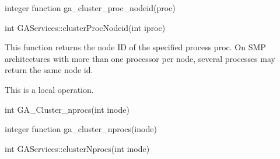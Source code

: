 \documentclass[12pt]{article}
\begin{document}
\begin{fapi}
\begin{fcode}
integer function ga_cluster_proc_nodeid(proc)
\end{fcode}
\begin{funcargs}
\end{funcargs}
\end{fapi}

\begin{cxxapi}
\begin{cxxcode}
int GAServices::clusterProcNodeid(int iproc)
\end{cxxcode}
\begin{funcargs}
\end{funcargs}
\end{cxxapi}

\begin{desc}

This function returns the node ID of the specified process proc. 
On SMP architectures with more than one processor per node, several 
processes may return the same node id.

This is a  local operation.
\end{desc}


\begin{capi}
\begin{ccode}
int GA_Cluster_nprocs(int inode)
\end{ccode}
\begin{funcargs}
\end{funcargs}
\end{capi}

\begin{fapi}
\begin{fcode}
integer function ga_cluster_nprocs(inode)
\end{fcode}
\begin{funcargs}
\end{funcargs}
\end{fapi}

\begin{cxxapi}
\begin{cxxcode}
int GAServices::clusterNprocs(int inode)
\end{cxxcode}
\begin{funcargs}
\end{funcargs}
\end{cxxapi}
\end{document}
